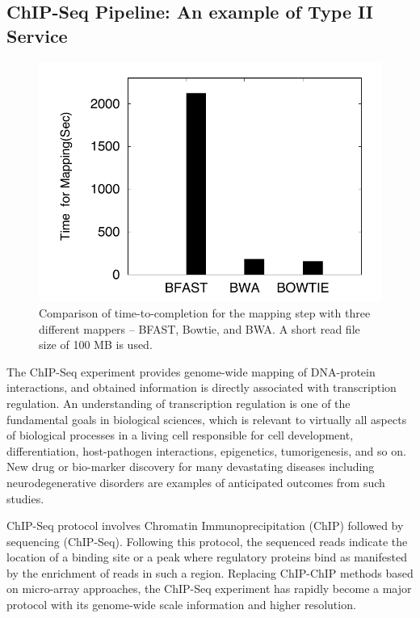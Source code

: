\documentclass{cpeauth}
\begin{document}
\subsection{ChIP-Seq Pipeline: An example of Type II Service}

\begin{figure}
 \centering
\includegraphics[scale=0.50]{figures/chip-seq-mapper-dependency-ttc.pdf}
\caption{\small Comparison of time-to-completion for the mapping step
  with three different mappers --  BFAST, Bowtie, and BWA. A
  short read file size of 100 MB is used.  }
  \label{fig:chip-seq-comp} 
 \end{figure}
 
 The ChIP-Seq experiment provides genome-wide mapping of DNA-protein
 interactions, and obtained information is directly associated with
 transcription regulation\cite{pepke2009, laajala, wilbanks}.  An
 understanding of transcription regulation is one of the fundamental
 goals in biological sciences, which is relevant to virtually all
 aspects of biological processes in a living cell responsible for cell
 development, differentiation, host-pathogen interactions,
 epigenetics, tumorigenesis, and so on.  New drug or bio-marker
 discovery for many devastating diseases including neurodegenerative
 disorders are examples of anticipated outcomes from such
 studies\cite{pepke2009}.

 ChIP-Seq protocol involves Chromatin Immunoprecipitation (ChIP)
 followed by sequencing (ChIP-Seq). Following this protocol, the
 sequenced reads indicate the location of a binding site or a peak
 where regulatory proteins bind as manifested by the enrichment of
 reads in such a region.  Replacing ChIP-ChIP methods based on
 micro-array approaches, the ChIP-Seq experiment has rapidly become a
 major protocol with its genome-wide scale information and higher
 resolution\cite{pepke2009,mardis2008-tig}.
\end{document}
